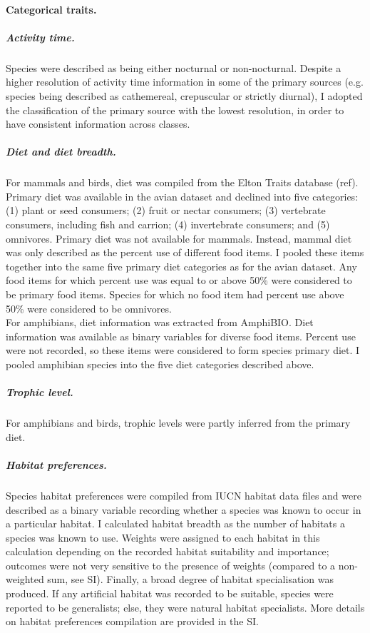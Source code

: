 \paragraph{Categorical traits.}
\subparagraph{Activity time.}
Species were described as being either nocturnal or non-nocturnal. Despite a higher resolution of activity time information in some of the primary sources (e.g. species being described as cathemereal, crepuscular or strictly diurnal), I adopted the classification of the primary source with the lowest resolution, in order to have consistent information across classes.
\subparagraph{Diet and diet breadth.}
For mammals and birds, diet was compiled from the Elton Traits database (ref). Primary diet was available in the avian dataset and declined into five categories: (1) plant or seed consumers; (2) fruit or nectar consumers; (3) vertebrate consumers, including fish and carrion; (4) invertebrate consumers; and (5) omnivores. Primary diet was not available for mammals. Instead, mammal diet was only described as the percent use of different food items. I pooled these items together into the same five primary diet categories as for the avian dataset. Any food items for which percent use was equal to or above 50\% were considered to be primary food items. Species for which no food item had percent use above 50\% were considered to be omnivores.\\ 
For amphibians, diet information was extracted from AmphiBIO. Diet information was available as binary variables for diverse food items. Percent use were not recorded, so these items were considered to form species primary diet. I pooled amphibian species into the five diet categories described above.
\subparagraph{Trophic level.} For amphibians and birds, trophic levels were partly inferred from the primary diet. 
\subparagraph{Habitat preferences.}
Species habitat preferences were compiled from IUCN habitat data files and were described as a binary variable recording whether a species was known to occur in a particular habitat. I calculated habitat breadth as the number of habitats a species was known to use. Weights were assigned to each habitat in this calculation depending on the recorded habitat suitability and importance; outcomes were not very sensitive to the presence of weights (compared to a non-weighted sum, see SI). Finally, a broad degree of habitat specialisation was produced. If any artificial habitat was recorded to be suitable, species were reported to be generalists; else, they were natural habitat specialists. More details on habitat preferences compilation are provided in the SI. 

